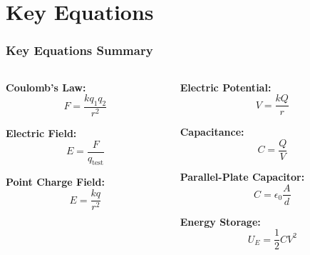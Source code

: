 \documentclass{beamer}
\begin{document}
\section{Key Equations}

\begin{frame}
    \frametitle{Key Equations Summary}
    \begin{columns}
        \begin{column}{0.5\textwidth}
            \textbf{Coulomb's Law:}
            \begin{equation}
                F = \frac{kq_1q_2}{r^2}
            \end{equation}
            
            \textbf{Electric Field:}
            \begin{equation}
                E = \frac{F}{q_{\text{test}}}
            \end{equation}
            
            \textbf{Point Charge Field:}
            \begin{equation}
                E = \frac{kq}{r^2}
            \end{equation}
        \end{column}
        
        \begin{column}{0.5\textwidth}
            \textbf{Electric Potential:}
            \begin{equation}
                V = \frac{kQ}{r}
            \end{equation}
            
            \textbf{Capacitance:}
            \begin{equation}
                C = \frac{Q}{V}
            \end{equation}
            
            \textbf{Parallel-Plate Capacitor:}
            \begin{equation}
                C = \epsilon_0 \frac{A}{d}
            \end{equation}
            
            \textbf{Energy Storage:}
            \begin{equation}
                U_E = \frac{1}{2}CV^2
            \end{equation}
        \end{column}
    \end{columns}
\end{frame}
\end{document}
